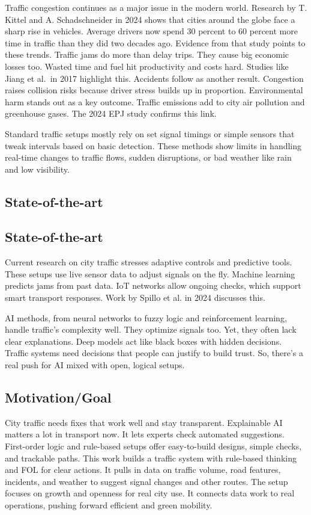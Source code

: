 \documentclass{article}
\begin{document}
Traffic congestion continues as a major issue in the modern world. Research by T. Kittel and A. Schadschneider in 2024 shows that cities around the globe face a sharp rise in vehicles. Average drivers now spend 30 percent to 60 percent more time in traffic than they did two decades ago. Evidence from that study points to these trends. Traffic jams do more than delay trips. They cause big economic losses too. Wasted time and fuel hit productivity and costs hard. Studies like Jiang et al.\ in 2017 highlight this. Accidents follow as another result. Congestion raises collision risks because driver stress builds up in proportion. Environmental harm stands out as a key outcome. Traffic emissions add to city air pollution and greenhouse gases. The 2024 EPJ study confirms this link.

Standard traffic setups mostly rely on set signal timings or simple sensors that tweak intervals based on basic detection. These methods show limits in handling real-time changes to traffic flows, sudden disruptions, or bad weather like rain and low visibility.

\subsection{State-of-the-art}
\subsection{State-of-the-art}

Current research on city traffic stresses adaptive controls and predictive tools. These setups use live sensor data to adjust signals on the fly. Machine learning predicts jams from past data. IoT networks allow ongoing checks, which support smart transport responses. Work by Spillo et al. in 2024 discusses this.

AI methods, from neural networks to fuzzy logic and reinforcement learning, handle traffic's complexity well. They optimize signals too. Yet, they often lack clear explanations. Deep models act like black boxes with hidden decisions. Traffic systems need decisions that people can justify to build trust. So, there's a real push for AI mixed with open, logical setups.

\subsection{Motivation/Goal}

City traffic needs fixes that work well and stay transparent. Explainable AI matters a lot in transport now. It lets experts check automated suggestions. First-order logic and rule-based setups offer easy-to-build designs, simple checks, and trackable paths. This work builds a traffic system with rule-based thinking and FOL for clear actions. It pulls in data on traffic volume, road features, incidents, and weather to suggest signal changes and other routes. The setup focuses on growth and openness for real city use. It connects data work to real operations, pushing forward efficient and green mobility.
\end{document}
